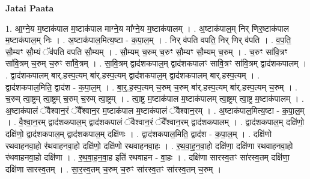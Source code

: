 \documentclass[17pt]{extarticle}
\begin{document}
\textbf{Jatai Paata} \newline

1. आ॒ग्ने॒य म॒ष्टाक॑पाल म॒ष्टाक॑पाल माग्ने॒य मा᳚ग्ने॒य म॒ष्टाक॑पालम् । . अ॒ष्टाक॑पाल॒म् निर् णिर॒ष्टाक॑पाल म॒ष्टाक॑पाल॒म् निः । . अ॒ष्टाक॑पाल॒मित्य॒ष्टा - क॒पा॒ल॒म् । . निर् व॑पति वपति॒ निर् णिर् व॑पति । . व॒प॒ति॒ सौ॒म्यꣳ सौ॒म्यं ॅव॑पति वपति सौ॒म्यम् । . सौ॒म्यम् च॒रुम् च॒रुꣳ सौ॒म्यꣳ सौ॒म्यम् च॒रुम् । . च॒रुꣳ सा॑वि॒त्रꣳ सा॑वि॒त्रम् च॒रुम् च॒रुꣳ सा॑वि॒त्रम् । . सा॒वि॒त्रम् द्वाद॑शकपाल॒म् द्वाद॑शकपालꣳ सावि॒त्रꣳ सा॑वि॒त्रम् द्वाद॑शकपालम् । . द्वाद॑शकपालम् बार्.हस्प॒त्यम् बा॑र्.हस्प॒त्यम् द्वाद॑शकपाल॒म् द्वाद॑शकपालम् बार्.हस्प॒त्यम् । . द्वाद॑शकपाल॒मिति॒ द्वाद॑श - क॒पा॒ल॒म् । . बा॒र्॒.ह॒स्प॒त्यम् च॒रुम् च॒रुम् बा॑र्.हस्प॒त्यम् बा॑र्.हस्प॒त्यम् च॒रुम् । . च॒रुम् त्वा॒ष्ट्रम् त्वा॒ष्ट्रम् च॒रुम् च॒रुम् त्वा॒ष्ट्रम् । . त्वा॒ष्ट्र म॒ष्टाक॑पाल म॒ष्टाक॑पालम् त्वा॒ष्ट्रम् त्वा॒ष्ट्र म॒ष्टाक॑पालम् । . अ॒ष्टाक॑पालं ॅवैश्वान॒रं ॅवै᳚श्वान॒र म॒ष्टाक॑पाल म॒ष्टाक॑पालं ॅवैश्वान॒रम् । . अ॒ष्टाक॑पाल॒मित्य॒ष्टा - क॒पा॒ल॒म् । . वै॒श्वा॒न॒रम् द्वाद॑शकपाल॒म् द्वाद॑शकपालं ॅवैश्वान॒रं ॅवै᳚श्वान॒रम् द्वाद॑शकपालम् । . द्वाद॑शकपाल॒म् दक्षि॑णो॒ दक्षि॑णो॒ द्वाद॑शकपाल॒म् द्वाद॑शकपाल॒म् दक्षि॑णः । . द्वाद॑शकपाल॒मिति॒ द्वाद॑श - क॒पा॒ल॒म् । . दक्षि॑णो रथवाहनवा॒हो र॑थवाहनवा॒हो दक्षि॑णो॒ दक्षि॑णो रथवाहनवा॒हः । . र॒थ॒वा॒ह॒न॒वा॒हो दक्षि॑णा॒ दक्षि॑णा रथवाहनवा॒हो र॑थवाहनवा॒हो दक्षि॑णा । . र॒थ॒वा॒ह॒न॒वा॒ह इति॑ रथवाहन - वा॒हः । . दक्षि॑णा सारस्व॒तꣳ सा॑रस्व॒तम् दक्षि॑णा॒ दक्षि॑णा सारस्व॒तम् । . सा॒र॒स्व॒तम् च॒रुम् च॒रुꣳ सा॑रस्व॒तꣳ सा॑रस्व॒तम् च॒रुम् । \newline
\end{document}
